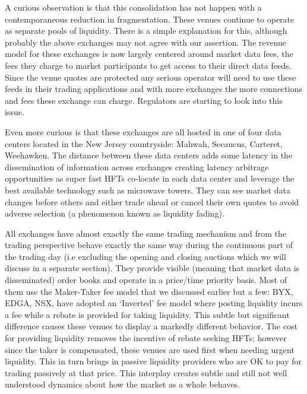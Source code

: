A curious observation is that this consolidation has not happen with a contemporaneous reduction in fragmentation. These venues continue to operate as separate pools of liquidity. There is a simple explanation for this, although probably the above exchanges may not agree with our assertion. The revenue model for these exchanges is now largely centered around market data fees, the fees they charge to market participants to get access to their direct data feeds. Since the venue quotes are protected any serious operator will need to use these feeds in their trading applications and with more exchanges the more connections and fees these exchange can charge.  Regulators are starting to look into this issue.


Even more curious is that these exchanges are all hosted in one of four data centers located in the New Jersey countryside: Mahwah, Secaucus, Carteret, Weehawken.  The distance between these data centers adds some latency in the dissemination of information across exchanges creating latency arbitrage opportunities as super fast HFTs co-locate in each data center and leverage the best available technology such as microwave towers. They can see market data changes before others and either trade ahead or cancel their own quotes to avoid adverse selection (a phenomenon known as liquidity fading).


All exchanges have almost exactly the same trading mechanism and from the trading perspective behave exactly the same way during the continuous part of the trading day (i.e excluding the opening and closing auctions which we will discuss in a separate section). They provide visible (meaning that market data is disseminated) order books and operate in a price/time priority basis. Most of them use the Maker-Taker fee model that we discussed earlier but a few: BYX, EDGA, NSX, have adopted an `Inverted' fee model where posting liquidity incurs a fee while a rebate is provided for taking liquidity. This subtle but significant difference causes these venues to display a markedly different behavior. The cost for providing liquidity removes the incentive of rebate seeking HFTs; however since the taker is compensated, these venues are used first when needing urgent liquidity. This in turn brings in passive liquidity providers who are OK to pay for trading passively at that price. This interplay creates subtle and still not well understood dynamics about how the market as a whole behaves.


